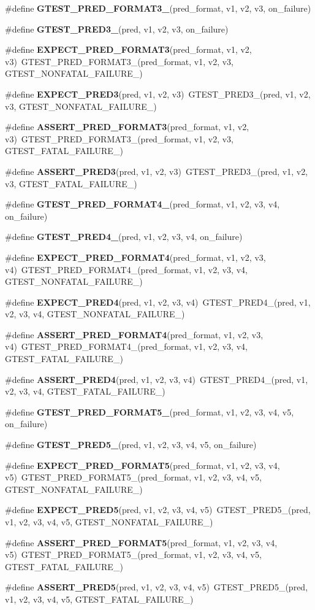 \begin{CompactItemize}
\#define {\bf GTEST\_\-PRED\_\-FORMAT3\_\-}(pred\_\-format, v1, v2, v3, on\_\-failure)
\item 
\#define {\bf GTEST\_\-PRED3\_\-}(pred, v1, v2, v3, on\_\-failure)
\item 
\#define {\bf EXPECT\_\-PRED\_\-FORMAT3}(pred\_\-format, v1, v2, v3)~GTEST\_\-PRED\_\-FORMAT3\_\-(pred\_\-format, v1, v2, v3, GTEST\_\-NONFATAL\_\-FAILURE\_\-)
\item 
\#define {\bf EXPECT\_\-PRED3}(pred, v1, v2, v3)~GTEST\_\-PRED3\_\-(pred, v1, v2, v3, GTEST\_\-NONFATAL\_\-FAILURE\_\-)
\item 
\#define {\bf ASSERT\_\-PRED\_\-FORMAT3}(pred\_\-format, v1, v2, v3)~GTEST\_\-PRED\_\-FORMAT3\_\-(pred\_\-format, v1, v2, v3, GTEST\_\-FATAL\_\-FAILURE\_\-)
\item 
\#define {\bf ASSERT\_\-PRED3}(pred, v1, v2, v3)~GTEST\_\-PRED3\_\-(pred, v1, v2, v3, GTEST\_\-FATAL\_\-FAILURE\_\-)
\item 
\#define {\bf GTEST\_\-PRED\_\-FORMAT4\_\-}(pred\_\-format, v1, v2, v3, v4, on\_\-failure)
\item 
\#define {\bf GTEST\_\-PRED4\_\-}(pred, v1, v2, v3, v4, on\_\-failure)
\item 
\#define {\bf EXPECT\_\-PRED\_\-FORMAT4}(pred\_\-format, v1, v2, v3, v4)~GTEST\_\-PRED\_\-FORMAT4\_\-(pred\_\-format, v1, v2, v3, v4, GTEST\_\-NONFATAL\_\-FAILURE\_\-)
\item 
\#define {\bf EXPECT\_\-PRED4}(pred, v1, v2, v3, v4)~GTEST\_\-PRED4\_\-(pred, v1, v2, v3, v4, GTEST\_\-NONFATAL\_\-FAILURE\_\-)
\item 
\#define {\bf ASSERT\_\-PRED\_\-FORMAT4}(pred\_\-format, v1, v2, v3, v4)~GTEST\_\-PRED\_\-FORMAT4\_\-(pred\_\-format, v1, v2, v3, v4, GTEST\_\-FATAL\_\-FAILURE\_\-)
\item 
\#define {\bf ASSERT\_\-PRED4}(pred, v1, v2, v3, v4)~GTEST\_\-PRED4\_\-(pred, v1, v2, v3, v4, GTEST\_\-FATAL\_\-FAILURE\_\-)
\item 
\#define {\bf GTEST\_\-PRED\_\-FORMAT5\_\-}(pred\_\-format, v1, v2, v3, v4, v5, on\_\-failure)
\item 
\#define {\bf GTEST\_\-PRED5\_\-}(pred, v1, v2, v3, v4, v5, on\_\-failure)
\item 
\#define {\bf EXPECT\_\-PRED\_\-FORMAT5}(pred\_\-format, v1, v2, v3, v4, v5)~GTEST\_\-PRED\_\-FORMAT5\_\-(pred\_\-format, v1, v2, v3, v4, v5, GTEST\_\-NONFATAL\_\-FAILURE\_\-)
\item 
\#define {\bf EXPECT\_\-PRED5}(pred, v1, v2, v3, v4, v5)~GTEST\_\-PRED5\_\-(pred, v1, v2, v3, v4, v5, GTEST\_\-NONFATAL\_\-FAILURE\_\-)
\item 
\#define {\bf ASSERT\_\-PRED\_\-FORMAT5}(pred\_\-format, v1, v2, v3, v4, v5)~GTEST\_\-PRED\_\-FORMAT5\_\-(pred\_\-format, v1, v2, v3, v4, v5, GTEST\_\-FATAL\_\-FAILURE\_\-)
\item 
\#define {\bf ASSERT\_\-PRED5}(pred, v1, v2, v3, v4, v5)~GTEST\_\-PRED5\_\-(pred, v1, v2, v3, v4, v5, GTEST\_\-FATAL\_\-FAILURE\_\-)
\end{CompactItemize}
